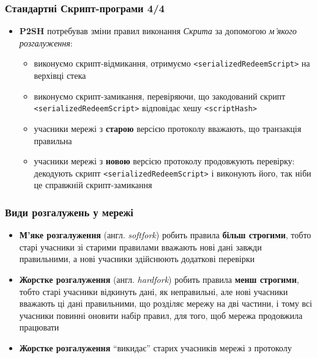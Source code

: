 \documentclass{beamer}
\begin{document}
\begin{frame}[fragile]
  \frametitle{Стандартні Скрипт-програми 4/4}
  \begin{itemize}
  \item \textbf{P2SH} потребував зміни правил виконання \textit{Скрита} за
    допомогою \textit{м'якого розгалуження}:
    \begin{itemize}
    \item виконуємо скрипт-відмикання, отримуємо
      \texttt{<serializedRedeemScript>} на верхівці стека
    \item виконуємо скрипт-замикання, перевіряючи, що закодований скрипт 
      \texttt{<serializedRedeemScript>} відповідає хешу
      \texttt{<scriptHash>}
    \item учасники мережі з \textbf{старою} версією протоколу вважають, що
      транзакція правильна
    \item учасники мережі з \textbf{новою} версією протоколу продовжують
      перевірку: декодують скрипт \texttt{<serializedRedeemScript>}
      і виконують його, так ніби це справжній скрипт-замикання
    \end{itemize}
  \end{itemize}
\end{frame}

\begin{frame}[fragile]
  \frametitle{Види розгалужень у мережі}
  \begin{itemize}
  \item \textbf{М'яке розгалуження} (англ. \textit{softfork}) робить правила
    \textbf{більш строгими}, тобто старі учасники зі старими правилами вважають
    нові дані завжди правильними, а нові учасники здійснюють додаткові перевірки
  \item \textbf{Жорстке розгалуження} (англ. \textit{hardfork}) робить правила
    \textbf{менш строгими}, тобто старі учасники відкинуть дані, як неправильні,
    але нові учасники вважають ці дані правильними, що розділяє мережу на дві
    частини, і тому всі учасники повинні оновити набір правил, для того, щоб
    мережа продовжила працювати
  \item \textbf{Жорстке розгалуження} ``викидає'' старих учасників мережі з
    протоколу
  \end{itemize}
\end{frame}
\end{document}
